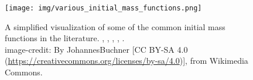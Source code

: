 \begin{figure}
  \centering
  \texttt{[image: img/various\_initial\_mass\_functions.png]}
  \caption{ \label{fig:various-imf}
    A simplified visualization of some of the common initial mass functions in the literature.
    , , , , . \\
    image-credit: By JohannesBuchner [CC BY-SA 4.0 (\url{https://creativecommons.org/licenses/by-sa/4.0})], from Wikimedia Commons.
  }
\end{figure}
